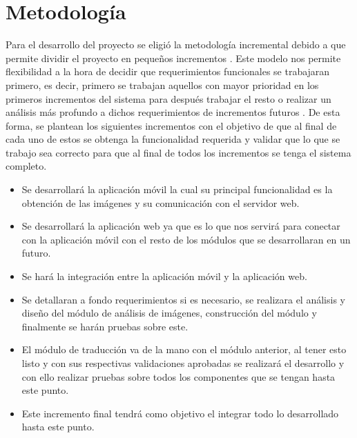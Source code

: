 \section{Metodología} Para el desarrollo del proyecto se eligió la metodología incremental debido a que permite dividir el proyecto en pequeños incrementos \cite{iterativeDevelopment}. Este modelo nos permite flexibilidad a la hora de decidir que requerimientos funcionales se trabajaran primero, es decir, primero se trabajan aquellos con mayor prioridad en los primeros incrementos del sistema para después trabajar el resto o realizar un análisis más profundo a dichos requerimientos de incrementos futuros \cite{sommerville}. De esta forma, se plantean los siguientes incrementos con el objetivo de que al final de cada uno de estos se obtenga la funcionalidad requerida y validar que lo que se trabajo sea correcto para que al final de todos los incrementos se tenga el sistema completo.
\begin{itemize}
	\item Se desarrollará la aplicación móvil la cual su principal funcionalidad es la obtención de las imágenes y su comunicación con el servidor web.
	\item Se desarrollará la aplicación web ya que es lo que nos servirá para conectar con la aplicación móvil con el resto de los módulos que se desarrollaran en un futuro.
	\item Se hará la integración entre la aplicación móvil y la aplicación web.
    \item Se detallaran a fondo requerimientos si es necesario, se realizara el análisis y diseño del módulo de análisis de imágenes, construcción del módulo y finalmente se harán pruebas sobre este.
    \item El módulo de traducción va de la mano con el módulo anterior, al tener esto listo y con sus respectivas validaciones aprobadas se realizará el desarrollo y con ello realizar pruebas sobre todos los componentes que se tengan hasta este punto.
    \item Este incremento final tendrá como objetivo el integrar todo lo desarrollado hasta este punto.
\end{itemize}





\newpage



